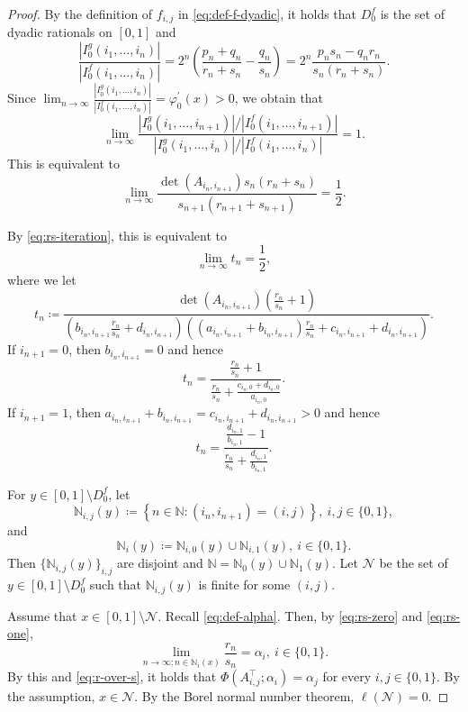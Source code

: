 \documentclass[10pt,a4paper]{amsart}
\begin{document}
\begin{proof}
By the definition of $f_{i,j}$ in \eqref{eq:def-f-dyadic}, it holds that $D^{f}_{0}$ is the set of dyadic rationals on $[0,1]$ and 
\[ \frac{|I^{g}_{0} (i_1, \dots, i_n)|}{|I^{f}_{0} (i_1, \dots, i_n)|} = 2^n \left( \frac{p_n + q_n}{r_n + s_n} - \frac{q_n}{s_n} \right) = 2^n \frac{p_n s_n - q_n r_n}{s_n (r_n + s_n)}. \]
Since 
$\displaystyle \lim_{n \to \infty} \frac{|I^{g}_{0} (i_1, \dots, i_n)|}{|I^{f}_{0} (i_1, \dots, i_n)|}  = \varphi_0^{\prime}(x) > 0$, 
we obtain that 
\[ \lim_{n \to \infty} \frac{|I^{g}_{0} (i_1, \dots, i_{n+1})| / |I^{f}_{0} (i_1, \dots, i_{n+1})| }{|I^{g}_{0} (i_1, \dots, i_n)| / |I^{f}_{0} (i_1, \dots, i_n)| } = 1. \]
This is equivalent to  
\[ \lim_{n \to \infty} \frac{\det(A_{i_n, i_{n+1}}) s_n (r_n + s_n)}{s_{n+1} (r_{n+1} + s_{n+1})} = \frac{1}{2}. \]

By \eqref{eq:rs-iteration}, this is equivalent to  
\[ \lim_{n \to \infty} t_n = \frac{1}{2}, \]
where we let 
\[ t_n \coloneqq \frac{\det(A_{i_n, i_{n+1}}) (\frac{r_n}{s_n} + 1)}{(b_{i_n, i_{n+1}} \frac{r_{n}}{s_n} + d_{i_n, i_{n+1}}) ((a_{i_n, i_{n+1}} + b_{i_n, i_{n+1}}) \frac{r_{n}}{s_n} + c_{i_n, i_{n+1}} + d_{i_n, i_{n+1}})}. \]
If $i_{n+1} = 0$, then $b_{i_n, i_{n+1}} = 0$ and hence 
\begin{equation}\label{eq:rs-zero} 
t_n = \frac{\frac{r_n}{s_n} + 1}{\frac{r_n}{s_n} + \frac{c_{i_n, 0} + d_{i_n, 0}}{a_{i_n, 0}}}. 
\end{equation} 
If $i_{n+1} = 1$, then $a_{i_n, i_{n+1}} + b_{i_n, i_{n+1}} = c_{i_n, i_{n+1}} + d_{i_n, i_{n+1}} > 0$ and hence 
\begin{equation}\label{eq:rs-one} 
t_n = \frac{\frac{d_{i_n,1}}{b_{i_n,1}} - 1}{\frac{r_n}{s_n} + \frac{d_{i_n, 1}}{b_{i_n, 1}}}. 
\end{equation}



For $y \in [0,1] \setminus  D_0^f$, let 
\[ \mathbb{N}_{i,j}(y) \coloneqq \left\{n \in \mathbb{N} \colon (i_n, i_{n+1}) = (i,j) \right\}, \ i, j \in \{0,1\},  \]
and 
\[ \mathbb{N}_{i}(y) \coloneqq \mathbb{N}_{i,0}(y) \cup \mathbb{N}_{i,1}(y), \ i \in \{0,1\}.  \]
Then $\{\mathbb{N}_{i,j}(y)\}_{i,j}$ are disjoint and $\mathbb{N} = \mathbb{N}_{0}(y) \cup \mathbb{N}_{1}(y)$. 
Let $\mathcal{N}$ be the set of $y \in [0,1] \setminus  D_0^f$ such that $\mathbb{N}_{i,j}(y)$ is finite for some $(i, j)$. 

Assume that $x \in [0,1] \setminus  \mathcal{N}$. 
Recall \eqref{eq:def-alpha}. 
Then, 
by \eqref{eq:rs-zero} and \eqref{eq:rs-one}, 
\[ \lim_{n \to \infty; n \in \mathbb{N}_i (x)} \frac{r_n}{s_n} = \alpha_i, \ i \in \{0,1\}.  \]
By this and \eqref{eq:r-over-s}, 
it holds that 
$\Phi \left(A_{i,j}^{\top}; \alpha_i \right) = \alpha_j$ for every $i, j \in \{0,1\}$. 
By the assumption, $x \in \mathcal{N}$. 
By the Borel normal number theorem, $\ell(\mathcal{N}) = 0$. 


\end{proof}
\end{document}
